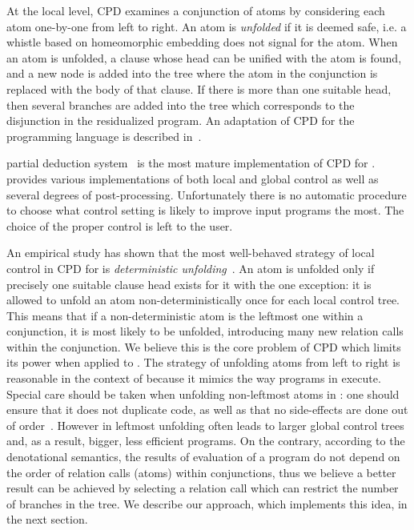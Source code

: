 At the local level, CPD examines a conjunction of atoms by considering each atom one-by-one from left to right.
An atom is \emph{unfolded} if it is deemed safe, i.e. a whistle based on homeomorphic embedding does not signal for the atom.
When an atom is unfolded, a clause whose head can be unified with the atom is found, and a new node is added into the tree where the atom in the conjunction is replaced with the body of that clause.
If there is more than one suitable head, then several branches are added into the tree which corresponds to the disjunction in the residualized program.
An adaptation of CPD for the \mk programming language is described in~\cite{lozov2019relational}.

\ecce partial deduction system~\cite{leuschel1997ecce} is the most mature implementation of CPD for \pro.
\ecce provides various implementations of both local and global control as well as several degrees of post-processing.
Unfortunately there is no automatic procedure to choose what control setting is likely to improve input programs the most.
The choice of the proper control is left to the user.

An empirical study has shown that the most well-behaved strategy of local control in CPD for \pro is \emph{deterministic unfolding}~\cite{leuschel1997advanced}.
An atom is unfolded only if precisely one suitable clause head exists for it with the one exception: it is allowed to unfold an atom non-deterministically once for each local control tree.
This means that if a non-deterministic atom is the leftmost one within a conjunction, it is most likely to be unfolded, introducing many new relation calls within the conjunction.
We believe this is the core problem of CPD which limits its power when applied to \mk.
The strategy of unfolding atoms from left to right is reasonable in the context of \pro because it mimics the way programs in \pro execute.
Special care should be taken when unfolding non-leftmost atoms in \pro: one should ensure that it does not duplicate code, as well as that no side-effects are done out of order~\cite{nonleftmost, leuschel2014fast}.
However in \mk leftmost unfolding often leads to larger global control trees and, as a result, bigger, less efficient programs.
On the contrary, according to the denotational semantics, the results of evaluation of a \mk program do not depend on the order of relation calls (atoms) within conjunctions, thus we believe a better result can be achieved by selecting a relation call which can restrict the number of branches in the tree.
We describe our approach, which implements this idea, in the next section.

